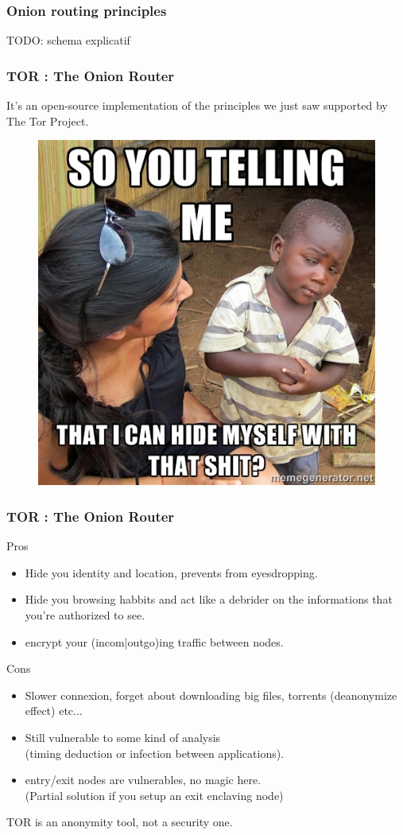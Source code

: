 \begin{frame}
\begin{center}
\frametitle{Onion routing principles}
TODO: schema explicatif
\end{center}
\end{frame}


\begin{frame}
\frametitle{TOR : The Onion Router}
It's an open-source implementation of the principles we just saw supported by
The Tor Project.
\begin{figure}
\includegraphics[width=0.5\linewidth]{./materials/septical_boy}
\end{figure}
\end{frame}
\begin{frame}
\frametitle{TOR : The Onion Router}
\begin{block}{Pros}
\begin{itemize}
\item Hide you identity and location, prevents from eyesdropping.
\item Hide you browsing habbits and act like a debrider on the informations that
you're authorized to see.
\item encrypt your (incom|outgo)ing traffic between nodes.
\end{itemize}
\end{block}
\begin{block}{Cons}
\begin{itemize}
\item Slower connexion, forget about downloading big files, torrents
(deanonymize effect) etc...
\item Still vulnerable to some kind of analysis
\\ (timing deduction or infection between applications).
\item entry/exit nodes are vulnerables, no magic here.
\\ (Partial solution if you setup an exit enclaving node)
\end{itemize}
\end{block}
TOR is an anonymity tool, not a security one.
\end{frame}

